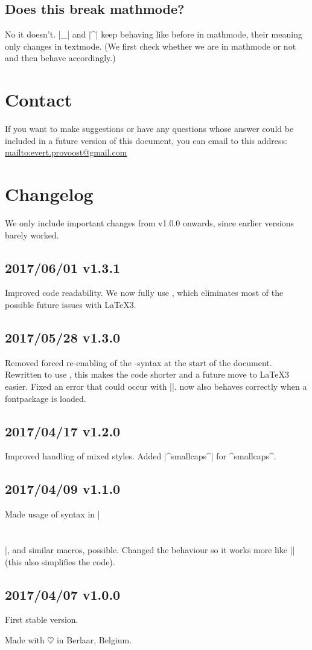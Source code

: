 \documentclass[11pt, cm-default]{l3doc}
\begin{document}
	\subsection{Does this break mathmode?}
	No it doesn't. |_| and |^| keep behaving like before in mathmode, their meaning only changes in textmode. (We first check whether we are in mathmode or not and then behave accordingly.)

	\section{Contact\label{contact}}
	If you want to make suggestions or have any questions whose answer could be included in a future version of this document, you can email to this address: \url{mailto:evert.provoost@gmail.com}
	\newpage
	
	\section{Changelog}
	We only include important changes from v1.0.0 onwards, since earlier versions barely worked.

	\subsection*{2017/06/01 v1.3.1}
	Improved code readability.
	We now fully use , which eliminates most of the possible future issues with \LaTeX3.

	\subsection*{2017/05/28 v1.3.0}
	Removed forced re-enabling of the -syntax at the start of the document.
	Rewritten to use , this makes the code shorter and a future move to \LaTeX3 easier.
	Fixed an error that could occur with |\cir|.
	 now also behaves correctly when a fontpackage is loaded.

	\subsection*{2017/04/17 v1.2.0}
	Improved handling of mixed styles.
	Added |^smallcaps^| for ^smallcaps^.

	\subsection*{2017/04/09 v1.1.0}
	Made usage of syntax in |\section{}|, and similar macros, possible. Changed the behaviour so it works more like |\emph{}| (this also simplifies the code).

	\subsection*{2017/04/07 v1.0.0}
	First stable version.

	\vspace*{\fill}\noindent
	Made with $\heartsuit$ in Berlaar, Belgium.
	\clearpage
\end{document}

